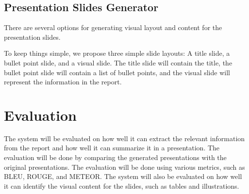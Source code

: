 \subsection{Presentation Slides Generator}
There are several options for generating visual layout and content for the presentation slides. 

To keep things simple, we propose three simple slide layouts: A title slide, a bullet point slide, and a visual slide. The title slide will contain the title, the bullet point slide will contain a list of bullet points, and the visual slide will represent the information in the report.

\section{Evaluation}
The system will be evaluated on how well it can extract the relevant information from the report and how well it can summarize it in a presentation. The evaluation will be done by comparing the generated presentations with the original presentations. The evaluation will be done using various metrics, such as BLEU, ROUGE, and METEOR. The system will also be evaluated on how well it can identify the visual content for the slides, such as tables and illustrations.

